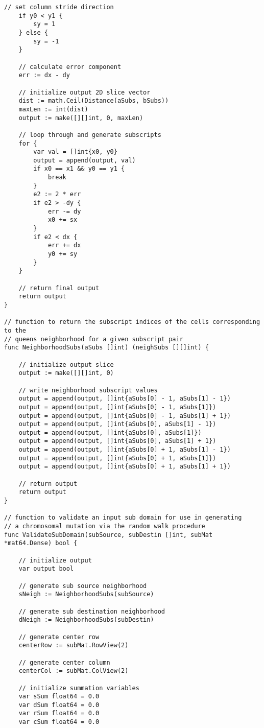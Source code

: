 \begin{lstlisting}[basicstyle=\tiny]
	// set column stride direction
	if y0 < y1 {
		sy = 1
	} else {
		sy = -1
	}

	// calculate error component
	err := dx - dy

	// initialize output 2D slice vector
	dist := math.Ceil(Distance(aSubs, bSubs))
	maxLen := int(dist)
	output := make([][]int, 0, maxLen)

	// loop through and generate subscripts
	for {
		var val = []int{x0, y0}
		output = append(output, val)
		if x0 == x1 && y0 == y1 {
			break
		}
		e2 := 2 * err
		if e2 > -dy {
			err -= dy
			x0 += sx
		}
		if e2 < dx {
			err += dx
			y0 += sy
		}
	}

	// return final output
	return output
}

// function to return the subscript indices of the cells corresponding to the
// queens neighborhood for a given subscript pair
func NeighborhoodSubs(aSubs []int) (neighSubs [][]int) {

	// initialize output slice
	output := make([][]int, 0)

	// write neighborhood subscript values
	output = append(output, []int{aSubs[0] - 1, aSubs[1] - 1})
	output = append(output, []int{aSubs[0] - 1, aSubs[1]})
	output = append(output, []int{aSubs[0] - 1, aSubs[1] + 1})
	output = append(output, []int{aSubs[0], aSubs[1] - 1})
	output = append(output, []int{aSubs[0], aSubs[1]})
	output = append(output, []int{aSubs[0], aSubs[1] + 1})
	output = append(output, []int{aSubs[0] + 1, aSubs[1] - 1})
	output = append(output, []int{aSubs[0] + 1, aSubs[1]})
	output = append(output, []int{aSubs[0] + 1, aSubs[1] + 1})

	// return output
	return output
}

// function to validate an input sub domain for use in generating
// a chromosomal mutation via the random walk procedure
func ValidateSubDomain(subSource, subDestin []int, subMat *mat64.Dense) bool {

	// initialize output
	var output bool

	// generate sub source neighborhood
	sNeigh := NeighborhoodSubs(subSource)

	// generate sub destination neighborhood
	dNeigh := NeighborhoodSubs(subDestin)

	// generate center row
	centerRow := subMat.RowView(2)

	// generate center column
	centerCol := subMat.ColView(2)

	// initialize summation variables
	var sSum float64 = 0.0
	var dSum float64 = 0.0
	var rSum float64 = 0.0
	var cSum float64 = 0.0


\end{lstlisting}
